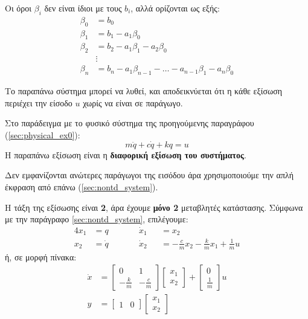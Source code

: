 \documentclass[11pt,a4paper,notitlepage,fleqn,final]{article}
\begin{document}
\begin{itemize}
     Οι όροι \( \beta_i \) δεν είναι ίδιοι με τους \( b_i \), αλλά ορίζονται ως εξής:
     \begin{align*}
     	\beta_0 &= b_0 \\
     	\beta_1 &= b_1 - a_1\beta_0\\
     	\beta_2 &= b_2 - a_1\beta_1 - a_2\beta_0\\
     	&\vdots\\
     	\beta_n &= b_n - a_1\beta_{n-1}-\dots - a_{n-1}\beta_1 - a_n\beta_0
     \end{align*}
     
     Το παραπάνω σύστημα μπορεί να λυθεί, και αποδεικνύεται ότι η κάθε εξίσωση περιέχει
     την είσοδο \( u \) χωρίς να είναι σε παράγωγο.
\end{itemize}

\begin{exercise}[Παράδειγμα]
	Στο παράδειγμα με το φυσικό σύστημα της προηγούμενης παραγράφου (\autoref{sec:physical_ex0}):
	\[
	m\ddot q + c\dot q + kq = u
	\]
	\tcblower
	Η παραπάνω εξίσωση είναι η \textbf{διαφορική εξίσωση του συστήματος}.
	
	Δεν εμφανίζονται ανώτερες παράγωγοι της εισόδου άρα χρησιμοποιούμε την απλή έκφραση
	από επάνω (\autoref{sec:nontd_system}).
	
	Η τάξη της εξίσωσης είναι \textbf{2}, άρα έχουμε \textbf{μόνο 2} μεταβλητές κατάστασης.
	Σύμφωνα με την παράγραφο \autoref{sec:nontd_system}, επιλέγουμε:
	\begin{alignat*}{4}
		x_1 &=q \qquad && \dot x_1&&=x_2 \\
		x_2&=\dot q \qquad && \dot x_2 &&= -\frac{c}{m}x_2 - \frac{k}{m}x_1
		+ \frac{1}{m}u
	\end{alignat*}
	ή, σε μορφή πίνακα:
	\begin{align*}
		\dot x &= \left[\begin{matrix}
		0 & 1 \\ -\frac{k}{m} & -\frac{c}{m}
		\end{matrix}\right]\left[\begin{matrix}
		x_1\\x_2
		\end{matrix}
		\right]+\left[\begin{matrix}
		0\\ \frac{1}{m}
		\end{matrix}\right]u\\
		y &= \left[\begin{matrix}
		1 & 0
		\end{matrix}\right]\left[\begin{matrix}
		x_1 \\ x_2
		\end{matrix}\right]
	\end{align*}
\end{exercise}
\end{document}
